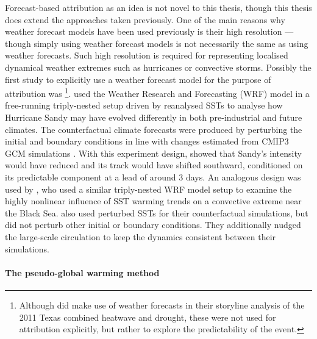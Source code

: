     Forecast-based attribution as an idea is not novel to this thesis, though this thesis does extend the approaches taken previously. One of the main reasons why weather forecast models have been used previously is their high resolution --- though simply using weather forecast models is not necessarily the same as using weather forecasts. Such high resolution is required for representing localised dynamical weather extremes such as hurricanes or convective storms. Possibly the first study to explicitly use a weather forecast model for the purpose of attribution was \citet{lackmann_hurricane_2015} \footnote{Although \citet{hoerling_anatomy_2013} did make use of weather forecasts in their storyline analysis of the 2011 Texas combined heatwave and drought, these were not used for attribution explicitly, but rather to explore the predictability of the event.}. \citeauthor[]{lackmann_hurricane_2015} used the Weather Research and Forecasting (WRF) model \citep{skamarock_description_2005} in a free-running triply-nested setup driven by reanalysed SSTs to analyse how Hurricane Sandy may have evolved differently in both pre-industrial and future climates. The counterfactual climate forecasts were produced by perturbing the initial and boundary conditions in line with changes estimated from CMIP3 GCM simulations \citep{meehl_wcrp_2007}. With this experiment design, \citeauthor{lackmann_hurricane_2015} showed that Sandy's intensity would have reduced and its track would have shifted southward, conditioned on its predictable component at a lead of around 3 days. An analogous design was used by \citet{meredith_crucial_2015}, who used a similar triply-nested WRF model setup to examine the highly nonlinear influence of SST warming trends on a convective extreme near the Black Sea. \citeauthor{meredith_crucial_2015} also used perturbed SSTs for their counterfactual simulations, but did not perturb other initial or boundary conditions. They additionally nudged the large-scale circulation to keep the dynamics consistent between their simulations. 

  \paragraph*{The pseudo-global warming method}

